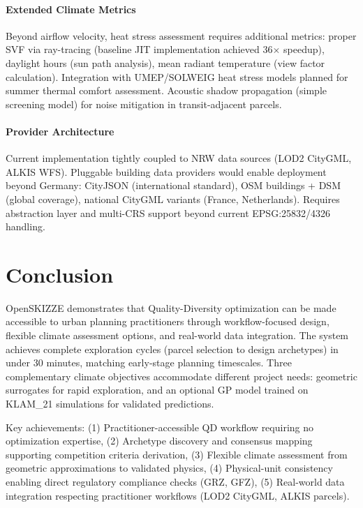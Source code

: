 \documentclass[times,final]{elsarticle}
\begin{document}
\paragraph{Extended Climate Metrics}
Beyond airflow velocity, heat stress assessment requires additional metrics: proper SVF via ray-tracing (baseline JIT implementation achieved 36$\times$ speedup), daylight hours (sun path analysis), mean radiant temperature (view factor calculation). Integration with UMEP/SOLWEIG heat stress models planned for summer thermal comfort assessment. Acoustic shadow propagation (simple screening model) for noise mitigation in transit-adjacent parcels.

\paragraph{Provider Architecture}
Current implementation tightly coupled to NRW data sources (LOD2 CityGML, ALKIS WFS). Pluggable building data providers would enable deployment beyond Germany: CityJSON (international standard), OSM buildings + DSM (global coverage), national CityGML variants (France, Netherlands). Requires abstraction layer and multi-CRS support beyond current EPSG:25832/4326 handling.

\section{Conclusion}

OpenSKIZZE demonstrates that Quality-Diversity optimization can be made accessible to urban planning practitioners through workflow-focused design, flexible climate assessment options, and real-world data integration. The system achieves complete exploration cycles (parcel selection to design archetypes) in under 30 minutes, matching early-stage planning timescales. Three complementary climate objectives accommodate different project needs: geometric surrogates for rapid exploration, and an optional GP model trained on KLAM\_21 simulations for validated predictions.

Key achievements: (1) Practitioner-accessible QD workflow requiring no optimization expertise, (2) Archetype discovery and consensus mapping supporting competition criteria derivation, (3) Flexible climate assessment from geometric approximations to validated physics, (4) Physical-unit consistency enabling direct regulatory compliance checks (GRZ, GFZ), (5) Real-world data integration respecting practitioner workflows (LOD2 CityGML, ALKIS parcels).
\end{document}
